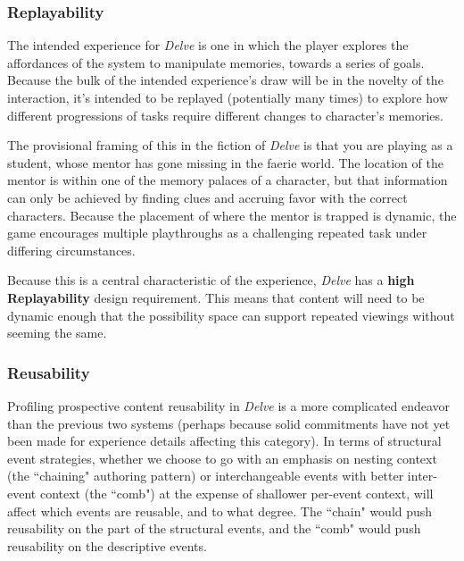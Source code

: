 \subsubsection{Replayability}\label{subsubsec:delve-replayability}

The intended experience for \textit{Delve} is one in which the player explores the affordances of the system to manipulate memories, towards a series of goals. Because the bulk of the intended experience's draw will be in the novelty of the interaction, it's intended to be replayed (potentially many times) to explore how different progressions of tasks require different changes to character's memories.

The provisional framing of this in the fiction of \textit{Delve} is that you are playing as a student, whose mentor has gone missing in the faerie world. The location of the mentor is within one of the memory palaces of a character, but that information can only be achieved by finding clues and accruing favor with the correct characters. Because the placement of where the mentor is trapped is dynamic, the game encourages multiple playthroughs as a challenging repeated task under differing circumstances.

Because this is a central characteristic of the experience, \textit{Delve} has a \textbf{high Replayability} design requirement. This means that content will need to be dynamic enough that the possibility space can support repeated viewings without seeming the same.

\subsubsection{Reusability}\label{subsubsec:delve-reusability}

Profiling prospective content reusability in \textit{Delve} is a more complicated endeavor than the previous two systems (perhaps because solid commitments have not yet been made for experience details affecting this category). In terms of structural event strategies, whether we choose to go with an emphasis on nesting context (the ``chaining" authoring pattern) or interchangeable events with better inter-event context (the ``comb") at the expense of shallower per-event context, will affect which events are reusable, and to what degree. The ``chain" would push reusability on the part of the structural events, and the ``comb" would push reusability on the descriptive events.

